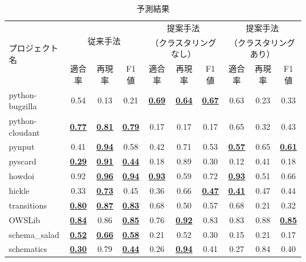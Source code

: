 \documentclass[T,J]{fose} %
\begin{document}
\begin{table}[t]
    \centering
    \caption{予測結果}
    \label{PrevPrediction}
    \begin{tabular}{l|ccc|ccc|ccc}
         \hline
         \multirow{3}{*}{プロジェクト名}&\multicolumn{3}{c|}{\multirow{2}{*}{従来手法}} & \multicolumn{3}{c|}{提案手法} & \multicolumn{3}{c}{提案手法}\\
         &\multicolumn{3}{c|}{} & \multicolumn{3}{c|}{（クラスタリングなし）} & \multicolumn{3}{c}{（クラスタリングあり）}\\ \cline{2-10}
          & 適合率 & 再現率 & F1値 & 適合率 & 再現率 & F1値 & 適合率 & 再現率 & F1値\\ \hline
         \hline %
            python-bugzilla & 0.54 & 0.13 & 0.21 & \textbf{\underline{0.69}} & \textbf{\underline{0.64}} & \textbf{\underline{0.67}} & 0.63 & 0.23 & 0.33\\
            python-cloudant & \textbf{\underline{0.77}} & \textbf{\underline{0.81}} & \textbf{\underline{0.79}} & 0.17 & 0.17 & 0.17 & 0.65 & 0.32 & 0.43\\
            pynput & 0.41 & \textbf{\underline{0.94}} & 0.58 & 0.42 & 0.71 & 0.53 & \textbf{\underline{0.57}} & 0.65 & \textbf{\underline{0.61}}\\
            pyscard & \textbf{\underline{0.29}} & \textbf{\underline{0.91}} & \textbf{\underline{0.44}} & 0.18 & 0.89 & 0.30 & 0.12 & 0.41 & 0.18\\
            howdoi & 0.92 & \textbf{\underline{0.96}} & \textbf{\underline{0.94}} & \textbf{\underline{0.93}} & 0.59 & 0.72 & \textbf{\underline{0.93}} & 0.51 & 0.66\\
            hickle & 0.33 & \textbf{\underline{0.73}} & 0.45 & 0.36 & 0.66 & \textbf{\underline{0.47}} & \textbf{\underline{0.41}} & 0.47 & 0.44\\
            transitions & \textbf{\underline{0.80}} & \textbf{\underline{0.87}} & \textbf{\underline{0.83}} & 0.68 & 0.50 & 0.57 & 0.68 & 0.21 & 0.32\\
            OWSLib & \textbf{\underline{0.84}} & 0.86 & \textbf{\underline{0.85}} & 0.76 & \textbf{\underline{0.92}} & 0.83 & 0.83 & 0.88 & \textbf{\underline{0.85}}\\
            schema\_salad & \textbf{\underline{0.52}} & \textbf{\underline{0.66}} & \textbf{\underline{0.58}} & 0.21 & 0.52 & 0.30 & 0.15 & 0.21 & 0.17\\
            schematics & \textbf{\underline{0.30}} & 0.79 & \textbf{\underline{0.44}} & 0.26 & \textbf{\underline{0.94}} & 0.41 & 0.27 & 0.84 & 0.40\\
    \hline
    \end{tabular}
\end{table}
\end{document}
